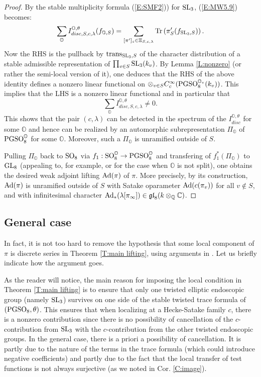 \documentclass[11pt]{amsart}
\theoremstyle{plain}
\numberwithin{equation}{section}
\newcommand{\Q}{\mathbb Q}
\newcommand{\C}{\mathbb C}
\def\SL{{\rm SL}}
\def\PGSO{{\rm PGSO}}
\def\GL{{\rm GL}}
\def\SO{{\rm SO}}
\def\C{{\bf C}}
\def\C{{\mathbb C}}
\begin{document}
\begin{proof}
 By the stable multiplicity formula  (\ref{E:SMF2})) for $\SL_3$,  (\ref{E:MW5.9}) becomes:
\[
 \sum_{\mathbb{O}}  I_{disc,S, c, \lambda}^{\mathbb{O}, \theta} (f_{\mathbb{O} ,S})  = 
 \sum_{[\pi']_s \in \Xi_{S, c, \lambda}}  {\rm Tr} \left( \pi'_S(f_{\SL_3,S}) \right). \]
 Now the RHS is the pullback by ${\rm trans}_{\SL_3,S}$ of the  character distribution  of a stable admissible representation of  $\prod_{v \in S}\SL_3(k_v)$.  
 By Lemma \ref{L:nonzero} (or rather the semi-local version of it), one deduces that the  
  RHS of the above identity defines a nonzero linear functional on $\otimes_{v \in S} C^{\infty}_c(\PGSO_8^{\mathbb{O}_v}(k_v))$. 
This implies that the LHS is a nonzero linear functional and in particular that 
\[ \sum_{\mathbb{O}}  I_{disc, S, c, \lambda}^{\mathbb{O}, \theta}  \ne 0. \]
This shows that the pair  $(c, \lambda)$   can be detected in the spectrum of the $I_{disc}^{\mathbb{O},\theta}$ for some $\mathbb{O}$ and hence can be realized by an automorphic subrepresentation $\Pi_{\mathbb{O}}$ of $\PGSO_8^{\mathbb{O}}$ for some $\mathbb{O}$. Moreover, such a $\Pi_{\mathbb{O}}$  is unramified outside of $S$.
\vskip 5pt

Pulling $\Pi_{\mathbb{O}}$ back to $\SO_8$ via $f_1: \SO_8^{\mathbb{O}} \rightarrow \PGSO_8^{\mathbb{O}}$ and
  transfering of $f_1^*(\Pi_{\mathbb{O}})$ to $\GL_8$ (appealing to, for example, \cite{CZ} or \cite{CFK} for the case when $\mathbb{O}$ is not split), one obtains
the desired weak adjoint lifting ${\rm Ad}(\pi)$ of $\pi$. More precisely,  by its construction, ${\rm Ad}(\pi)$ is unramified outside of $S$ with Satake oparameter ${\rm Ad}(c(\pi_v))$ for all $v \notin S$, and with infinitesimal character ${\rm Ad}_*(\lambda[\pi_{\infty}]) \in \mathfrak{gl}_8(k \otimes_{\Q} \C)$.
\end{proof}
\vskip 5pt

\subsection{\bf General case} \label{SS:general}
In fact, it is not  too hard to remove the hypothesis that some local component of $\pi$ is discrete series in Theorem \ref{T:main lifting}, using arguments in \cite[\S 3.5, esp. Prop. 3.5.1]{A}. 
 Let us briefly indicate how the argument goes. 
 \vskip 5pt
 
 As the reader will notice, the main reason for imposing the local condition in Theorem \ref{T:main lifting} is to ensure that only one twisted elliptic endoscopic group (namely $\SL_3$) survives on one side of the stable twisted trace formula of $(\PGSO_8, \theta)$. This ensures that when localizing at a Hecke-Satake family $c$, there is a nonzero contribution since there is no possibility of cancellation of the $c$-contribution from $\SL_3$ with the $c$-contribution from the other twisted endoscopic groups. 
In the general case,  there is a priori a  possibility of cancellation. It is partly due to the nature of the terms in the trace formula (which could introduce negative coefficients) and partly due to the fact that the local transfer of test functions is not always surjective (as we noted in Cor. \ref{C:image}). 
\vskip 5pt
\end{document}
